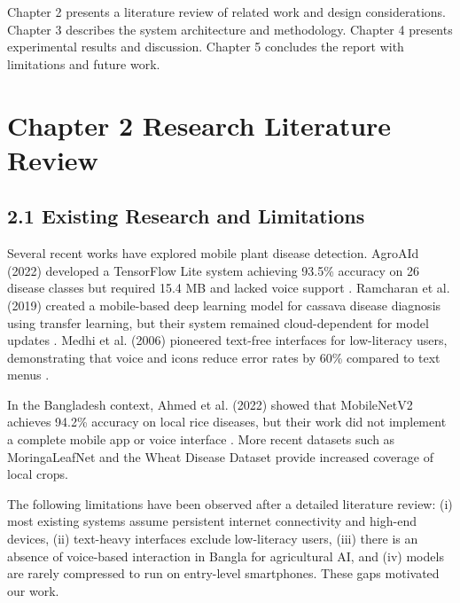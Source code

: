 \documentclass[12pt,letterpaper]{report}
\begin{document}
Chapter 2 presents a literature review of related work and design considerations. Chapter 3 describes the system architecture and methodology. Chapter 4 presents experimental results and discussion. Chapter 5 concludes the report with limitations and future work.

\chapter*{Chapter 2 Research Literature Review}

\section*{2.1 Existing Research and Limitations}

Several recent works have explored mobile plant disease detection. AgroAId (2022) developed a TensorFlow Lite system achieving 93.5\% accuracy on 26 disease classes but required 15.4 MB and lacked voice support \cite{ref8}. Ramcharan et al. (2019) created a mobile-based deep learning model for cassava disease diagnosis using transfer learning, but their system remained cloud-dependent for model updates \cite{ref6}. Medhi et al. (2006) pioneered text-free interfaces for low-literacy users, demonstrating that voice and icons reduce error rates by 60\% compared to text menus \cite{ref7}.

In the Bangladesh context, Ahmed et al. (2022) showed that MobileNetV2 achieves 94.2\% accuracy on local rice diseases, but their work did not implement a complete mobile app or voice interface \cite{ref10}. More recent datasets such as MoringaLeafNet \cite{ref11} and the Wheat Disease Dataset \cite{ref12} provide increased coverage of local crops.

The following limitations have been observed after a detailed literature review: (i) most existing systems assume persistent internet connectivity and high-end devices, (ii) text-heavy interfaces exclude low-literacy users, (iii) there is an absence of voice-based interaction in Bangla for agricultural AI, and (iv) models are rarely compressed to run on entry-level smartphones. These gaps motivated our work.
\end{document}

